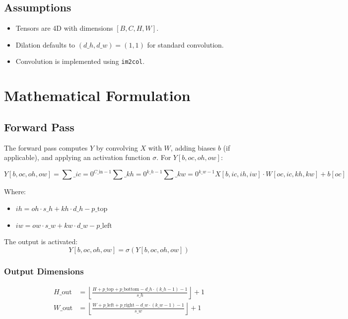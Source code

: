 \documentclass{article}
\begin{document}
\subsection{Assumptions}
\begin{itemize}
    \item Tensors are 4D with dimensions $[B, C, H, W]$.
    \item Dilation defaults to $(d\_h, d\_w) = (1, 1)$ for standard convolution.
    \item Convolution is implemented using \texttt{im2col}.
\end{itemize}

\section{Mathematical Formulation}

\subsection{Forward Pass}
The forward pass computes $Y$ by convolving $X$ with $W$, adding biases $b$ (if applicable), and applying an activation function $\sigma$. For $Y[b, oc, oh, ow]$:

\begin{equation}
Y[b, oc, oh, ow] = \sum\_{ic=0}^{C\_{\text{in}}-1} \sum\_{kh=0}^{k\_h-1} \sum\_{kw=0}^{k\_w-1} X[b, ic, ih, iw] \cdot W[oc, ic, kh, kw] + b[oc]
\end{equation}

Where:
\begin{itemize}
    \item $ih = oh \cdot s\_h + kh \cdot d\_h - p\_{\text{top}}$
    \item $iw = ow \cdot s\_w + kw \cdot d\_w - p\_{\text{left}}$
\end{itemize}

The output is activated:
\begin{equation}
Y[b, oc, oh, ow] = \sigma(Y[b, oc, oh, ow])
\end{equation}

\subsubsection{Output Dimensions}
\begin{align}
H\_{\text{out}} &= \left\lfloor \frac{H + p\_{\text{top}} + p\_{\text{bottom}} - d\_h \cdot (k\_h - 1) - 1}{s\_h} \right\rfloor + 1 \\
W\_{\text{out}} &= \left\lfloor \frac{W + p\_{\text{left}} + p\_{\text{right}} - d\_w \cdot (k\_w - 1) - 1}{s\_w} \right\rfloor + 1
\end{align}
\end{document}
